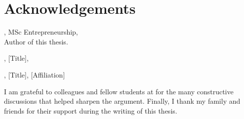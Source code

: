 \chapter*{Acknowledgements}
\thispagestyle{plain}

\noindent
\textbf{\thesisauthor}, MSc Entrepreneurship, \thesisuniversity\\
Author of this thesis.

\medskip
\noindent
\textbf{\thesissupervisor}, [Title], \thesisdepartment\\

\medskip
\noindent
\textbf{\thesiscosupervisor}, [Title], [Affiliation]\\

\medskip
\noindent
I am grateful to colleagues and fellow students at \thesisdepartment{} for
the many constructive discussions that helped sharpen the argument.
Finally, I thank my family and friends for their support during the writing
of this thesis.
